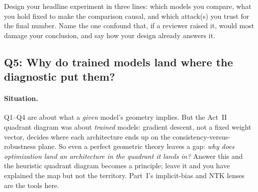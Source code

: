 \begin{problem}
Design your headline experiment in three lines: which models you compare, what you hold fixed to
make the comparison causal, and which attack(s) you trust for the final number. Name the one
confound that, if a reviewer raised it, would most damage your conclusion, and say how your design
already answers it.
\end{problem}

\subsection{Q5: Why do trained models land where the diagnostic put them?}
\label{sub:p2-q5}

\paragraph{Situation.} Q1--Q4 are about what a \emph{given} model's geometry implies. But the
Act~II quadrant diagram was about \emph{trained} models: gradient descent, not a fixed weight
vector, decides where each architecture ends up on the consistency-versus-robustness plane. So even
a perfect geometric theory leaves a gap: \emph{why does optimization land an architecture in the
quadrant it lands in?} Answer this and the heuristic quadrant diagram becomes a principle; leave it
and you have explained the map but not the territory. Part~I's implicit-bias and NTK lenses are the
tools here.

